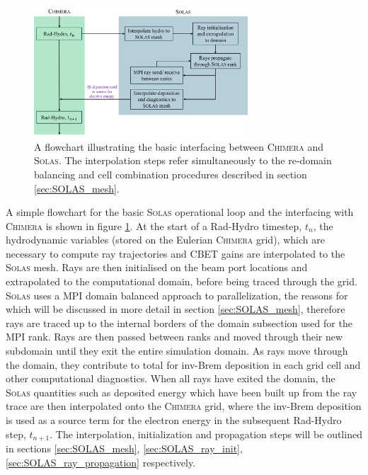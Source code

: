 \begin{figure}[t!]
    \includegraphics[width=8cm]{Numerics/Images/raytrace_flowchart.png}
    \centering
    \caption{A flowchart illustrating the basic interfacing between \textsc{Chimera} and \textsc{Solas}.
    The interpolation steps refer simultaneously to the re-domain balancing and cell combination procedures described in section \ref{sec:SOLAS_mesh}.}
    \label{fig:raytrace_flowchart}
\end{figure}

A simple flowchart for the basic \textsc{Solas} operational loop and the interfacing with \textsc{Chimera} is shown in figure \ref{fig:raytrace_flowchart}.
At the start of a \ac{Rad-Hydro} timestep, $t_n$, the hydrodynamic variables (stored on the Eulerian \textsc{Chimera} grid), which are necessary to compute ray trajectories and \ac{CBET} gains are interpolated to the \textsc{Solas} mesh.
Rays are then initialised on the beam port locations and extrapolated to the computational domain, before being traced through the grid.
\textsc{Solas} uses a \ac{MPI} domain balanced approach to parallelization, the reasons for which will be discussed in more detail in section \ref{sec:SOLAS_mesh}, therefore rays are traced up to the internal borders of the domain subsection used for the \ac{MPI} rank.
Rays are then passed between ranks and moved through their new subdomain until they exit the entire simulation domain.
As rays move through the domain, they contribute to total for \ac{inv-Brem} deposition in each grid cell and other computational diagnostics.
When all rays have exited the domain, the \textsc{Solas} quantities such as deposited energy which have been built up from the ray trace are then interpolated onto the \textsc{Chimera} grid, where the \ac{inv-Brem} deposition is used as a source term for the electron energy in the subsequent \ac{Rad-Hydro} step, $t_{n+1}$.
The interpolation, initialization and propagation steps will be outlined in sections \ref{sec:SOLAS_mesh}, \ref{sec:SOLAS_ray_init}, \ref{sec:SOLAS_ray_propagation} respectively.


